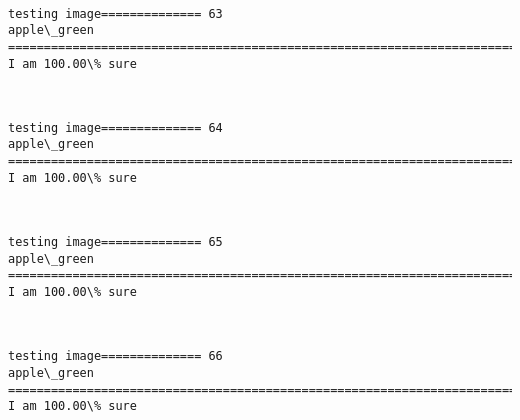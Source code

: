 \documentclass[11pt]{article}
\begin{document}
    \begin{center}
    \end{center}
    { \hspace*{\fill} \\}
    
    \begin{Verbatim}[commandchars=\\\{\}]
testing image============== 63
apple\_green
============================================================================
I am 100.00\% sure

    \end{Verbatim}

    \begin{center}
    \end{center}
    { \hspace*{\fill} \\}
    
    \begin{Verbatim}[commandchars=\\\{\}]
testing image============== 64
apple\_green
============================================================================
I am 100.00\% sure

    \end{Verbatim}

    \begin{center}
    \end{center}
    { \hspace*{\fill} \\}
    
    \begin{Verbatim}[commandchars=\\\{\}]
testing image============== 65
apple\_green
============================================================================
I am 100.00\% sure

    \end{Verbatim}

    \begin{center}
    \end{center}
    { \hspace*{\fill} \\}
    
    \begin{Verbatim}[commandchars=\\\{\}]
testing image============== 66
apple\_green
============================================================================
I am 100.00\% sure

    \end{Verbatim}
\end{document}
